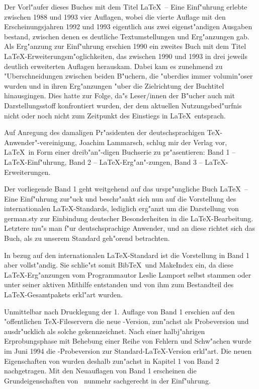 \documentclass[twoside]{article}
\begin{document}
Der Vorl"aufer dieses Buches mit dem Titel \LaTeX\ -- Eine Einf"uhrung
erlebte zwischen 1988 und 1993 vier Auflagen, wobei die vierte Auflage
mit den Erscheinungsjahren 1992 und 1993 eigentlich aus zwei
eigenst"andigen Ausgaben bestand, zwischen denen es deutliche
Textumstellungen und Erg"anzungen gab. Als Erg"anzung zur Einf"uhrung
erschien 1990 ein zweites Buch mit dem Titel
\LaTeX-Erweiterungsm"oglichkeiten, das zwischen 1990 und 1993 in drei jeweils
deutlich erweiterten Auflagen herauskam. Dabei kam es zunehmend zu 
"Uberschneidungen zwischen beiden B"uchern, die "uberdies immer volumin"oser
wurden und in ihren Erg"anzungen "uber die Zielrichtung der
Buchtitel hinausgingen. Dies hatte zur Folge, da"s Leser/innen der B"ucher
auch mit Darstellungsstoff konfrontiert wurden, der dem aktuellen 
Nutzungsbed"urfnis nicht oder noch nicht zum Zeitpunkt des Einstiegs in \LaTeX\ 
entsprach.

Auf Anregung des damaligen Pr"asidenten der deutschsprachigen
\TeX-Anwender"-vereinigung, Joachim Lammarsch, schlug mir der Verlag vor,
\LaTeX\ in Form einer dreib"an"-digen Buchserie zu pr"asentieren: 
Band 1 -- \LaTeX-Einf"uhrung, Band 2 -- \LaTeX-Erg"an"-zungen, Band 3 --
\LaTeX-Erweiterungen.

Der vorliegende Band 1 geht weitgehend auf das urspr"ungliche Buch 
\LaTeX\ -- Eine Einf"uhrung zur"uck und beschr"ankt sich nun auf die
Vorstellung des internationalen \LaTeX-Standards, lediglich erg"anzt
um die Darstellung von german.sty zur Einbindung deutscher 
Besonderheiten in die \LaTeX-Bearbeitung. Letztere mu"s man f"ur 
deutschsprachige Anwender, und an diese richtet sich das Buch, als zu
unserem Standard geh"orend betrachten. 

In bezug auf den internationalen \LaTeX-Standard ist die Vorstellung
in Band 1 aber vollst"andig. Sie schlie"st somit Bib\TeX\
und MakeIndex ein, da diese \LaTeX-Erg"anzungen
vom Programmautor Leslie Lamport selbst stammen oder unter seiner
aktiven Mithilfe entstanden und von ihm zum Bestandteil des \LaTeX-Gesamtpakets 
erkl"art wurden.

Unmittelbar nach Drucklegung der 1. Auflage von Band 1 erschien auf den
"offentlichen \TeX-Fileservern die neue \LaTeXe-Version, zun"achst als
Probeversion und ausdr"ucklich als solche gekennzeichnet. Nach einer
halbj"ahrigen Erprobungsphase mit Behebung einer Reihe von Fehlern und
Schw"achen wurde im Juni 1994 die \LaTeXe-Probeversion zur
Standard-\LaTeX-Version erkl"art. Die neuen Eigenschaften von \LaTeXe wurden
deshalb zun"achst in Kapitel 1 von Band 2 nachgetragen. Mit den Neuauflagen
von Band 1 erscheinen die Grundeigenschaften
von \LaTeXe\ nunmehr sachgerecht in der Einf"uhrung. 
\end{document}
